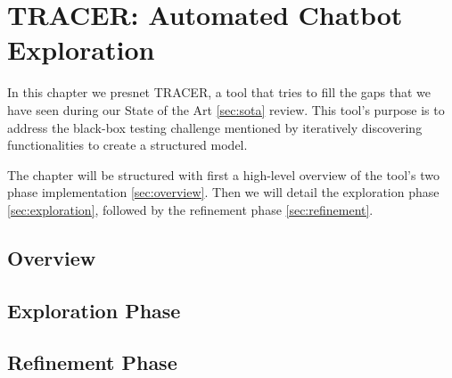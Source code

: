 
\chapter{TRACER: Automated Chatbot Exploration}\label{chapter:tracer}

In this chapter we presnet \ac{TRACER},
a tool that tries to fill the gaps that we have seen
during our State of the Art \autoref{sec:sota} review.
This tool's purpose is to address the black-box testing challenge mentioned
by iteratively discovering functionalities
to create a structured model.

The chapter will be structured with first
a high-level overview of the tool's two phase implementation \autoref{sec:overview}.
Then we will detail the exploration phase \autoref{sec:exploration},
followed by the refinement phase \autoref{sec:refinement}.

\section{Overview}\label{sec:overview}



\section{Exploration Phase}\label{sec:exploration}

\section{Refinement Phase}\label{sec:refinement}


